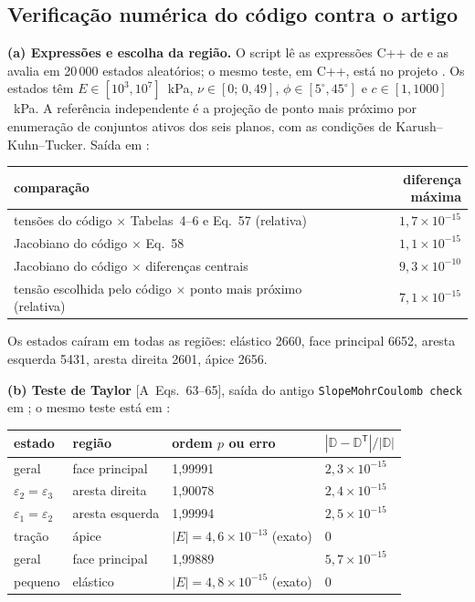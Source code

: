 \documentclass[11pt,a4paper]{article}
\numberwithin{equation}{section}
\newcommand{\code}[1]{\texttt{#1}}
\newcommand{\art}[1]{{\footnotesize\textsf{[A~#1]}}}
\begin{document}
\subsection{Verificação numérica do código contra o artigo}\label{sec:mcverif}

\textbf{(a) Expressões e escolha da região.} O script  lê as expressões C++ de
 e as avalia em 20\,000 estados aleatórios; o mesmo teste, em C++, está no projeto
. Os estados têm $E\in[10^3,10^7]$~kPa,
$\nu\in[0;\,0{,}49]$, $\phi\in[5^\circ,45^\circ]$ e $c\in[1,1000]$~kPa. A referência independente é a projeção de ponto
mais próximo por enumeração de conjuntos ativos dos seis planos, com as condições de Karush--Kuhn--Tucker. Saída em
:
\begin{center}\small
\begin{tabular}{@{}lr@{}}
\toprule
comparação & diferença máxima\\
\midrule
tensões do código $\times$ Tabelas~4--6 e Eq.~57 (relativa) & $1{,}7\times10^{-15}$\\
Jacobiano do código $\times$ Eq.~58 & $1{,}1\times10^{-15}$\\
Jacobiano do código $\times$ diferenças centrais & $9{,}3\times10^{-10}$\\
tensão escolhida pelo código $\times$ ponto mais próximo (relativa) & $7{,}1\times10^{-15}$\\
\bottomrule
\end{tabular}
\end{center}
Os estados caíram em todas as regiões: elástico 2660, face principal 6652, aresta esquerda 5431, aresta direita 2601,
ápice 2656.

\textbf{(b) Teste de Taylor} \art{Eqs.~63--65}, saída do antigo \code{SlopeMohrCoulomb check} em
; o mesmo teste está em :
\begin{center}\small
\begin{tabular}{@{}llll@{}}
\toprule
estado & região & ordem $p$ ou erro & $|\mathbb D-\mathbb D^{\mathsf T}|/|\mathbb D|$\\
\midrule
geral & face principal & 1,99991 & $2{,}3\times10^{-15}$\\
$\varepsilon_2=\varepsilon_3$ & aresta direita & 1,90078 & $2{,}4\times10^{-15}$\\
$\varepsilon_1=\varepsilon_2$ & aresta esquerda & 1,99994 & $2{,}5\times10^{-15}$\\
tração & ápice & $|E|=4{,}6\times10^{-13}$ (exato) & 0\\
geral & face principal & 1,99889 & $5{,}7\times10^{-15}$\\
pequeno & elástico & $|E|=4{,}8\times10^{-15}$ (exato) & 0\\
\bottomrule
\end{tabular}
\end{center}
\end{document}
